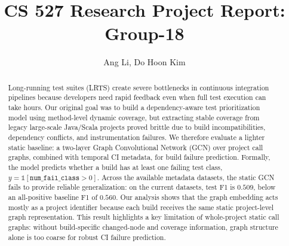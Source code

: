 \documentclass[sigconf,authorversion,nonacm]{acmart}
\begin{document}
\title{CS 527 Research Project Report: Group-18}

\author{Ang Li, Do Hoon Kim}

\begin{abstract}
    Long-running test suites (LRTS) create severe bottlenecks in continuous integration pipelines because developers need rapid feedback even when full test execution can take hours. Our original goal was to build a dependency-aware test prioritization model using method-level dynamic coverage, but extracting stable coverage from legacy large-scale Java/Scala projects proved brittle due to build incompatibilities, dependency conflicts, and instrumentation failures. We therefore evaluate a lighter static baseline: a two-layer Graph Convolutional Network (GCN) over project call graphs, combined with temporal CI metadata, for build failure prediction. Formally, the model predicts whether a build has at least one failing test class, $y=\mathbb{1}[\texttt{num\_fail\_class}>0]$. Across the available metadata datasets, the static GCN fails to provide reliable generalization: on the current datasets, test F1 is $0.509$, below an all-positive baseline F1 of $0.560$. Our analysis shows that the graph embedding acts mostly as a project identifier because each build receives the same static project-level graph representation. This result highlights a key limitation of whole-project static call graphs: without build-specific changed-node and coverage information, graph structure alone is too coarse for robust CI failure prediction.
\end{abstract}

\maketitle









\end{document}
